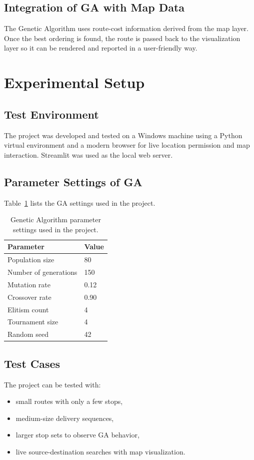 \subsection{Integration of GA with Map Data}
The Genetic Algorithm uses route-cost information derived from the map layer. Once the best ordering is found, the route is passed back to the visualization layer so it can be rendered and reported in a user-friendly way.

\section{Experimental Setup}
\subsection{Test Environment}
The project was developed and tested on a Windows machine using a Python virtual environment and a modern browser for live location permission and map interaction. Streamlit was used as the local web server.

\subsection{Parameter Settings of GA}
Table~\ref{tab:ga-params} lists the GA settings used in the project.

\begin{table}[H]
\centering
\caption{Genetic Algorithm parameter settings used in the project.}
\label{tab:ga-params}
\begin{tabular}{ll}
\toprule
Parameter & Value \\
\midrule
Population size & 80 \\
Number of generations & 150 \\
Mutation rate & 0.12 \\
Crossover rate & 0.90 \\
Elitism count & 4 \\
Tournament size & 4 \\
Random seed & 42 \\
\bottomrule
\end{tabular}
\end{table}

\subsection{Test Cases}
The project can be tested with:
\begin{itemize}[leftmargin=1.5em]
    \item small routes with only a few stops,
    \item medium-size delivery sequences,
    \item larger stop sets to observe GA behavior,
    \item live source-destination searches with map visualization.
\end{itemize}


